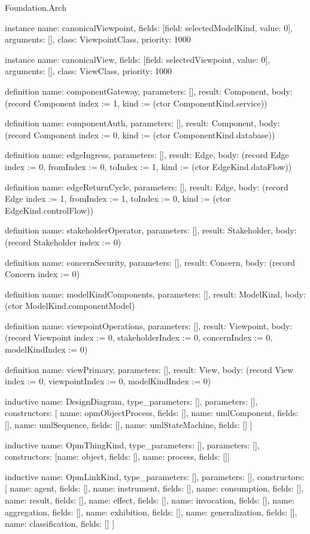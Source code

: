 \begin{lexlean}{Foundation.Arch}
\begin{semanticmodule}
instance{
  name: canonicalViewpoint,
  fields: [{field: selectedModelKind, value: 0}],
  arguments: [],
  class: ViewpointClass,
  priority: 1000
}

instance{
  name: canonicalView,
  fields: [{field: selectedViewpoint, value: 0}],
  arguments: [],
  class: ViewClass,
  priority: 1000
}

definition{
  name: componentGateway,
  parameters: [],
  result: Component,
  body: (record Component {index := 1, kind := (ctor ComponentKind.service)})
}

definition{
  name: componentAuth,
  parameters: [],
  result: Component,
  body: (record Component {index := 0, kind := (ctor ComponentKind.database)})
}

definition{
  name: edgeIngress,
  parameters: [],
  result: Edge,
  body: (record Edge {index := 0, fromIndex := 0, toIndex := 1, kind := (ctor EdgeKind.dataFlow)})
}

definition{
  name: edgeReturnCycle,
  parameters: [],
  result: Edge,
  body: (record Edge {index := 1, fromIndex := 1, toIndex := 0, kind := (ctor EdgeKind.controlFlow)})
}

definition{
  name: stakeholderOperator,
  parameters: [],
  result: Stakeholder,
  body: (record Stakeholder {index := 0})
}

definition{
  name: concernSecurity,
  parameters: [],
  result: Concern,
  body: (record Concern {index := 0})
}

definition{
  name: modelKindComponents,
  parameters: [],
  result: ModelKind,
  body: (ctor ModelKind.componentModel)
}

definition{
  name: viewpointOperations,
  parameters: [],
  result: Viewpoint,
  body: (record Viewpoint {index := 0, stakeholderIndex := 0, concernIndex := 0, modelKindIndex := 0})
}

definition{
  name: viewPrimary,
  parameters: [],
  result: View,
  body: (record View {index := 0, viewpointIndex := 0, modelKindIndex := 0})
}

inductive{
  name: DesignDiagram,
  type_parameters: [],
  parameters: [],
  constructors: [
    {name: opmObjectProcess, fields: []},
    {name: umlComponent, fields: []},
    {name: umlSequence, fields: []},
    {name: umlStateMachine, fields: []}
  ]
}

inductive{
  name: OpmThingKind,
  type_parameters: [],
  parameters: [],
  constructors: [{name: object, fields: []}, {name: process, fields: []}]
}

inductive{
  name: OpmLinkKind,
  type_parameters: [],
  parameters: [],
  constructors: [
    {name: agent, fields: []},
    {name: instrument, fields: []},
    {name: consumption, fields: []},
    {name: result, fields: []},
    {name: effect, fields: []},
    {name: invocation, fields: []},
    {name: aggregation, fields: []},
    {name: exhibition, fields: []},
    {name: generalization, fields: []},
    {name: classification, fields: []}
  ]
}


\end{semanticmodule}
\end{lexlean}
